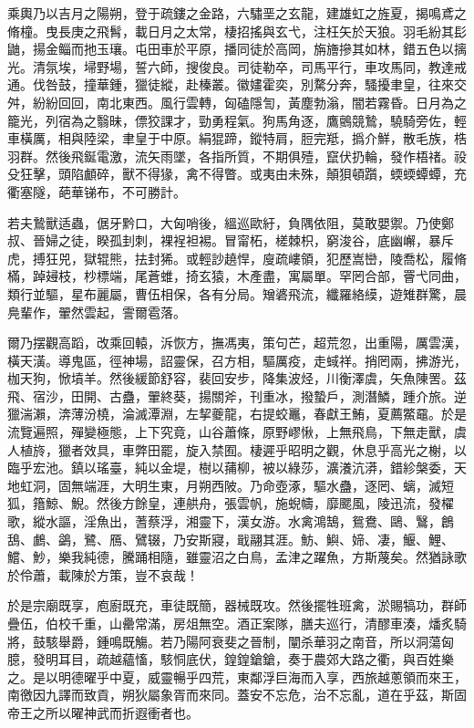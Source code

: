 \begin{pinyinscope}
乘輿乃以吉月之陽朔，登于疏鏤之金路，六驌垩之玄龍，建雄虹之旌夏，揭鳴鳶之脩橦。曳長庚之飛髾，載日月之太常，棲招搖與玄弋，注枉矢於天狼。羽毛紛其髟鼬，揚金鲻而扡玉瓖。屯田車於平原，播同徒於高岡，旃旝摻其如林，錯五色以摛光。清氛埃，埽野場，誓六師，搜俊良。司徒勒卒，司馬平行，車攻馬同，教達戒通。伐咎鼓，撞華鍾，獵徒縱，赴榛叢。徽嫿霍奕，別騖分奔，騷擾聿皇，往來交舛，紛紛回回，南北東西。風行雲轉，匈磕隱訇，黃塵勃滃，闇若霧昏。日月為之籠光，列宿為之翳昧，僄狡課才，勁勇程氣。狗馬角逐，鷹鸇競鷙，驍騎旁佐，輕車橫厲，相與陸梁，聿皇于中原。絹猑蹄，鏦特肩，脰完羝，撝介鮮，散毛族，梏羽群。然後飛鋋電激，流矢雨墜，各指所質，不期俱殪，竄伏扔輪，發作梧禇。祋殳狂擊，頭陷顱碎，獸不得猭，禽不得瞥。或夷由未殊，顛狽頓躓，蝡蝡蟫蟫，充衢塞隧，葩華锑布，不可勝計。

若夫鷙獸适蟲，倨牙黔口，大匈哨後，縕巡歐紆，負隅依阻，莫敢嬰禦。乃使鄭叔、晉婦之徒，睽孤刲刺，裸裎袒裼。冒甯柘，槎棘枳，窮浚谷，底幽嶰，暴斥虎，搏狂兕，獄辊熊，抾封狶。或輕訬趬悍，廋疏嶁領，犯歷嵩巒，陵喬松，履脩樠，踔攳枝，杪標端，尾蒼蜼，掎玄猿，木產盡，寓屬單。罕罔合部，罾弋同曲，類行並驅，星布麗屬，曹伍相保，各有分局。矰碆飛流，纖羅絡縸，遊雉群驚，晨鳧輩作，翬然雲起，霅爾雹落。

爾乃摆觀高蹈，改乘回轅，泝恢方，撫馮夷，策句芒，超荒忽，出重陽，厲雲漢，橫天潢。導鬼區，徑神場，詔靈保，召方相，驅厲疫，走蜮祥。捎罔兩，拂游光，枷天狗，惞墳羊。然後緩節舒容，裴回安步，降集波烃，川衡澤虞，矢魚陳罟。茲飛、宿沙，田開、古蠱，翬終葵，揚關斧，刊重冰，撥蟄戶，測潛鱗，踵介旅。逆獵湍瀨，渀薄汾橈，淪滅潭淵，左挈夔龍，右提蛟鼉，春獻王鮪，夏薦鱉黿。於是流覽遍照，殫變極態，上下究竟，山谷蕭條，原野嵺愀，上無飛鳥，下無走獸，虞人植旍，獵者效具，車弊田罷，旋入禁囿。棲遲乎昭明之觀，休息乎高光之榭，以臨乎宏池。鎮以瑤臺，純以金堤，樹以蒱柳，被以綠莎，瀇瀁沆漭，錯紾槃委，天地虹洞，固無端涯，大明生東，月朔西陂。乃命壺涿，驅水蠱，逐罔、螭，滅短狐，簎鯨、鯢。然後方餘皇，連舼舟，張雲帆，施蜺幬，靡颸風，陵迅流，發櫂歌，縱水謳，淫魚出，蓍蔡浮，湘靈下，漢女游。水禽鴻鵠，鴛鴦、鷗、鷖，鶬鴰、鸕、鷁，鷺、鴈、鷿辍，乃安斯寢，戢翮其涯。魴、鱮、媂、凄，鰋、鯉、鱨、魦，樂我純德，騰踊相隨，雖靈沼之白鳥，孟津之躍魚，方斯蔑矣。然猶詠歌於伶蕭，載陳於方策，豈不哀哉！

於是宗廟既享，庖廚既充，車徒既簡，器械既攻。然後擺牲班禽，淤賜犒功，群師疊伍，伯校千重，山罍常滿，房俎無空。酒正案隊，膳夫巡行，清醪車湊，燔炙騎將，鼓駭舉爵，鍾鳴既觴。若乃陽阿衰斐之晉制，闡杀華羽之南音，所以洞蕩匈臆，發明耳目，疏越蘊慉，駭恫底伏，鍠鍠鎗鎗，奏于農郊大路之衢，與百姓樂之。是以明德曜乎中夏，威靈暢乎四荒，東鄰浮巨海而入享，西旅越蔥領而來王，南徼因九譯而致貢，朔狄屬象胥而來同。蓋安不忘危，治不忘亂，道在乎茲，斯固帝王之所以曜神武而折遐衝者也。


\end{pinyinscope}
